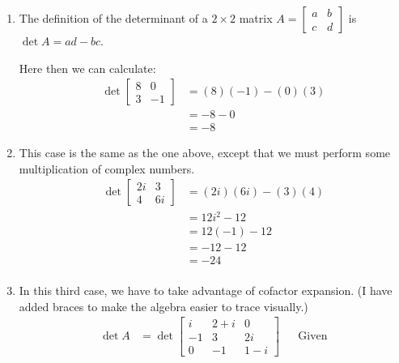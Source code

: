 \documentclass[10pt,letterpaper,final]{report}
\newcommand{\reason}[1]{&& \text{#1}}
\begin{document}
\begin{enumerate}[label=(\alph*)]
  \item The definition of the determinant of a $2 \times 2$ matrix $A = \begin{bmatrix}
            a & b \\
            c & d
          \end{bmatrix}$ is $\det A = ad - bc$.

        Here then we can calculate: \begin{align*}
          \det \begin{bmatrix}
                 8 & 0  \\
                 3 & -1
               \end{bmatrix} & = (8)(-1) - (0)(3) \\[1ex]
                                 & = -8 - 0       \\
                                 & = -8
        \end{align*}
  \item This case is the same as the one above, except that we must perform some multiplication of complex numbers. \begin{align*}
          \det \begin{bmatrix}
                 2i & 3  \\
                 4  & 6i
               \end{bmatrix} & = (2i)(6i) - (3)(4) \\[1ex]
                                 & = 12i^2 - 12    \\[1ex]
                                 & = 12(-1) - 12   \\[1ex]
                                 & = -12 - 12      \\[1ex]
                                 & = -24           \\[1ex]
        \end{align*}
  \item In this third case, we have to take advantage of cofactor expansion. (I have added braces to make the algebra easier to trace visually.)
        \begin{align*}
          \det A & = \det \begin{bmatrix}
                            i  & 2 + i & 0   \\
                            -1 & 3     & 2i  \\
                            0  & -1    & 1-i
                          \end{bmatrix}  \reason{Given}                                                                                                                                                        \\[1ex]

\end{align*}
\end{enumerate}
\end{document}
